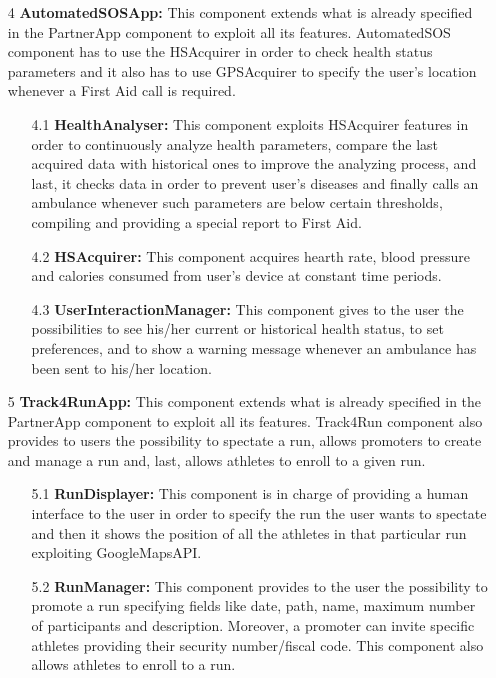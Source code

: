 \begin{enumerate}
\item [4]\textbf{AutomatedSOSApp: }
This component extends what is already specified in the PartnerApp component to exploit all its features. AutomatedSOS component has to use the HSAcquirer in order to check health status parameters and it also has to use GPSAcquirer to specify the user's location whenever a First Aid call is required.

	\begin{enumerate}
	\item [4.1]\textbf{HealthAnalyser: }
	This component exploits HSAcquirer features in order to continuously analyze health parameters, compare the last acquired data with historical ones to improve the analyzing process, and last, it checks data in order to prevent user's diseases and finally calls an ambulance whenever such parameters are below certain thresholds, compiling and providing a special report to First Aid.
	
	\item [4.2]\textbf{HSAcquirer:}
	This component acquires hearth rate, blood pressure and calories consumed from user's device at constant time periods.
	
	\item [4.3]\textbf{UserInteractionManager:}
	This component gives to the user the possibilities to see his/her current or historical health status, to set preferences, and to show a warning message whenever an ambulance has been sent to his/her location.
	\end{enumerate}
	

\item [5]\textbf{Track4RunApp: }
This component extends what is already specified in the PartnerApp component to exploit all its features. Track4Run component also provides to users the possibility to spectate a run, allows promoters to create and manage a run and, last, allows athletes to enroll to a given run.
	
		\begin{enumerate}
	\item [5.1]\textbf{RunDisplayer: }
	 This component is in charge of providing a human interface to the user in order to specify the run the user wants to spectate and then it shows the position of all the athletes in that particular run exploiting GoogleMapsAPI.
	
	\item [5.2]\textbf{RunManager: }
	This component provides to the user the possibility to promote a run specifying fields like date, path, name, maximum number of participants and description. Moreover, a promoter can invite specific athletes providing their security number/fiscal code. This component also allows athletes to enroll to a run.
	\end{enumerate}

\end{enumerate}

